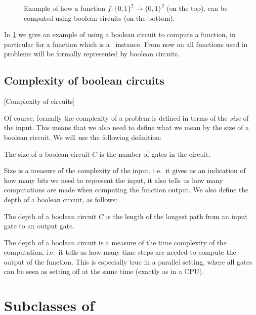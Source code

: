 \begin{figure}
    \centering
    \caption[Computing a function with circuits]{Example of how a function $f : \{0, 1\}^2 \rightarrow \{0, 1\}^2$ (on the top), can be computed using boolean circuits (on the bottom).}
    \label{fig:computing_function_example}
\end{figure}

In \cref{fig:computing_function_example} we give an example of using a boolean circuit to compute a function, in particular for a function which is a \Tarski\ instance. From now on all functions used in problems will be formally represented by boolean circuits.

\subsection{Complexity of boolean circuits}[Complexity of circuits]

Of course, formally the complexity of a problem is defined in terms of the \emph{size} of the input. This means that we also need to define what we mean by the size of a boolean circuit. We will use the following definition:

\begin{definition}
    The size of a boolean circuit $C$ is the number of gates in the circuit.
\end{definition}

Size is a measure of the complexity of the input, i.e.\ it gives us an indication of how many bits we need to represent the input, it also tells us how many computations are made when computing the function output. We also define the depth of a boolean circuit, as follows:

\begin{definition}
    The depth of a boolean circuit $C$ is the length of the longest path from an input gate to an output gate.
\end{definition}

The depth of a boolean circuit is a measure of the time complexity of the computation, i.e.\ it tells us how many time steps are needed to compute the output of the function. This is especially true in a parallel setting, where all gates can be seen as setting off at the same time (exactly as in a CPU).

\section{Subclasses of \TFNP}


